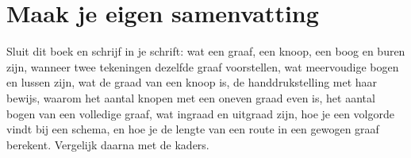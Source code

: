 
\ifzelfstudie
\section*{Maak je eigen samenvatting}
Sluit dit boek en schrijf in je schrift: wat een graaf, een knoop, een boog en buren zijn, wanneer twee tekeningen dezelfde graaf voorstellen, wat meervoudige bogen en lussen zijn, wat de graad van een knoop is, de handdrukstelling met haar bewijs, waarom het aantal knopen met een oneven graad even is, het aantal bogen van een volledige graaf, wat ingraad en uitgraad zijn, hoe je een volgorde vindt bij een schema, en hoe je de lengte van een route in een gewogen graaf berekent. Vergelijk daarna met de kaders.
\fi

